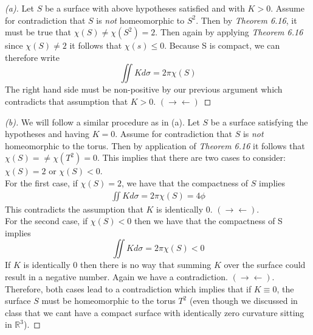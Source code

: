 \documentclass[a4paper, 11pt]{article}
\begin{document}
	\begin{proof}[(a)]
		Let $S$ be a surface with above hypotheses satisfied and with $K>0$. Assume for contradiction that $S$ is \textit{not} homeomorphic to $S^2$. Then by \textit{Theorem 6.16}, it must be true that $\chi(S)\neq\chi(S^2) = 2$. Then again by applying \textit{Theorem 6.16} since $\chi(S)\neq 2$ it follows that $\chi(s)\leq 0$. Because S is compact, we can therefore write
			\begin{equation*}
				\iint K d\sigma = 2\pi\chi(S)
			\end{equation*}
		The right hand side must be non-positive by our previous argument which contradicts that assumption that $K>0$.  $(\rightarrow \leftarrow)$
	\end{proof}
	
	\begin{proof}[(b)]
		We will follow a similar procedure as in (a). Let $S$ be a surface satisfying the hypotheses and having $K=0$. Assume for contradiction that $S$ is \textit{not} homeomorphic to the torus. Then by application of \textit{Theorem 6.16} it follows that $\chi(S)=\neq\chi(T^2)=0$. This implies that there are two cases to consider: $\chi(S) = 2$ or $\chi(S) < 0$. \\ 
		
		\noindent For the first case, if $\chi(S) = 2$, we have that the compactness of $S$ implies
			\begin{align*}
				\iint K d\sigma = 2\pi\chi(S) = 4\phi
			\end{align*}
		This contradicts the assumption that $K$ is identically $0$. $(\rightarrow \leftarrow)$. \\ 
		
		\noindent For the second case, if $\chi(S)<0$ then we have that the compactness of S implies 
			\begin{equation*}
				\iint K d\sigma = 2\pi\chi(S) < 0
			\end{equation*}
		If $K$ is identically $0$ then there is no way that summing $K$ over the surface could result in a negative number. Again we have a contradiction. $(\rightarrow\leftarrow)$. Therefore, both cases lead to a contradiction which implies that if $K\equiv0$, the surface $S$ must be homeomorphic to the torus $T^2$ (even though we discussed in class that we cant have a compact surface with identically zero curvature sitting in $\mathbb{R}^3$).
		

\end{proof}
\end{document}
